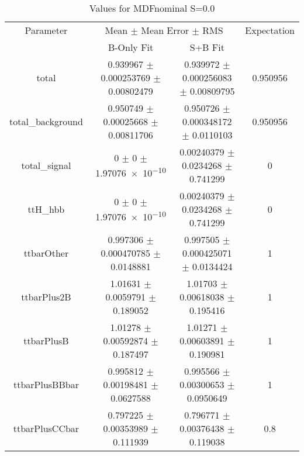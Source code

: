 \begin{table}
\centering
\caption{Values for MDFnominal S=0.0}
\begin{tabular}{cccc}
\toprule
Parameter & \multicolumn{2}{c}{Mean $\pm$ Mean Error $\pm$ RMS} & Expectation\\
 & B-Only Fit & S+B Fit & \\
\midrule
total & \num{0.939967} $\pm$ \num{0.000253769} $\pm$ \num{0.00802479} & \num{0.939972} $\pm$ \num{0.000256083} $\pm$ \num{0.00809795} & \num{0.950956}\\
total\_background & \num{0.950749} $\pm$ \num{0.00025668} $\pm$ \num{0.00811706} & \num{0.950726} $\pm$ \num{0.000348172} $\pm$ \num{0.0110103} & \num{0.950956}\\
total\_signal & \num{0} $\pm$ \num{0} $\pm$ \num{1.97076e-10} & \num{0.00240379} $\pm$ \num{0.0234268} $\pm$ \num{0.741299} & \num{0}\\
ttH\_hbb & \num{0} $\pm$ \num{0} $\pm$ \num{1.97076e-10} & \num{0.00240379} $\pm$ \num{0.0234268} $\pm$ \num{0.741299} & \num{0}\\
ttbarOther & \num{0.997306} $\pm$ \num{0.000470785} $\pm$ \num{0.0148881} & \num{0.997505} $\pm$ \num{0.000425071} $\pm$ \num{0.0134424} & \num{1}\\
ttbarPlus2B & \num{1.01631} $\pm$ \num{0.0059791} $\pm$ \num{0.189052} & \num{1.01703} $\pm$ \num{0.00618038} $\pm$ \num{0.195416} & \num{1}\\
ttbarPlusB & \num{1.01278} $\pm$ \num{0.00592874} $\pm$ \num{0.187497} & \num{1.01271} $\pm$ \num{0.00603891} $\pm$ \num{0.190981} & \num{1}\\
ttbarPlusBBbar & \num{0.995812} $\pm$ \num{0.00198481} $\pm$ \num{0.0627588} & \num{0.995566} $\pm$ \num{0.00300653} $\pm$ \num{0.0950649} & \num{1}\\
ttbarPlusCCbar & \num{0.797225} $\pm$ \num{0.00353989} $\pm$ \num{0.111939} & \num{0.796771} $\pm$ \num{0.00376438} $\pm$ \num{0.119038} & \num{0.8}\\
\bottomrule
\end{tabular}
\end{table}